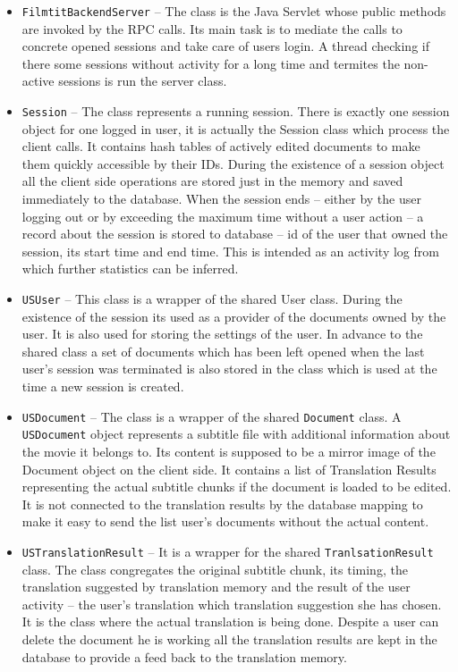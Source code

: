 \begin{itemize}
\item {\tt FilmtitBackendServer}  -- The class is the Java Servlet whose public methods are invoked by the RPC calls. Its main task is to mediate the calls to concrete opened sessions and take care of users login. A thread checking if there some sessions without activity for a long time and termites the non-active sessions is run the server class.

\item {\tt Session} -- The class represents a running session. There is exactly one session object for one logged in user, it is actually the Session class which process the client calls. It contains hash tables of actively edited documents to make them quickly accessible by their IDs. During the existence of a session object all the client side operations are stored just in the memory and saved immediately to the database. When the session ends -- either by the user logging out or by exceeding the maximum time without a user action -- a record about the session is stored to database -- id of the user that owned the session, its start time and end time. This is intended as an activity log from which further statistics can be inferred.

\item {\tt USUser} -- This class is a wrapper of the shared User class. During the existence of the session its used as a provider of the documents owned by the user. It is also used for storing the settings of the user. In advance to the shared class a set of documents which has been left opened when the last user's session was terminated is also stored in the class which is used at the time a new session is created. 

\item {\tt USDocument} -- The class is a wrapper of the shared {\tt Document} class. A {\tt USDocument} object represents a subtitle file with additional information about the movie it belongs to. Its content is supposed to be a mirror image of the Document object on the client side. It contains a list of Translation Results representing the actual subtitle chunks if the document is loaded to be edited. It is not connected to the translation results by the database mapping to make it easy to send the list user's documents without the actual content.

\item {\tt USTranslationResult} -- It is a wrapper for the shared {\tt TranlsationResult} class. The class congregates the original subtitle chunk, its timing, the translation suggested by translation memory and the result of the user activity -- the user's translation which translation suggestion she has chosen. It is the class where the actual translation is being done. Despite a user can delete the document he is working all the translation results are kept in the database to provide a  feed back to the translation memory.


\end{itemize}
